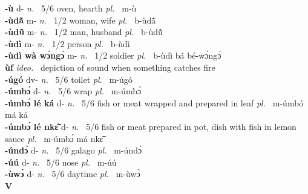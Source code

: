 \noindent
{\bfseries -ù} d- {\itshape n.~} 5/6 oven, hearth {\itshape pl.~} m-ù    \\ 
{\bfseries -ùdã̂} m- {\itshape n.~} 1/2 woman, wife {\itshape pl.~} b-ùdã̂    \\ 
{\bfseries -ùdũ̂} m- {\itshape n.~} 1/2 man, husband {\itshape pl.~} b-ùdũ̂    \\ 
{\bfseries -ùdì} m- {\itshape n.~} 1/2 person {\itshape pl.~} b-ùdì    \\ 
{\bfseries -ùdì wà wɔ́ngɔ́} m- {\itshape n.~} 1/2 soldier {\itshape pl.~} b-ùdì bá bé-wɔ́ngɔ́    \\ 
{\bfseries ùf}  {\itshape ideo.~} depiction of sound when something catches fire    \\ 
{\bfseries -úgó} dv- {\itshape n.~} 5/6 toilet {\itshape pl.~} m-úgó    \\ 
{\bfseries -úmbɔ́} d- {\itshape n.~} 5/6 wrap {\itshape pl.~} m-úmbɔ́    \\ 
{\bfseries -úmbɔ́ lé ká} d- {\itshape n.~} 5/6 fish or meat wrapped and prepared in leaf {\itshape pl.~} m-úmbó má ká    \\ 
{\bfseries -úmbɔ́ lé nkɛ̃̂} d- {\itshape n.~} 5/6  fish or meat prepared in pot, dish with fish in lemon sauce {\itshape pl.~} m-úmbɔ́ má nkɛ̃̂    \\ 
{\bfseries -úndɔ̀} d- {\itshape n.~} 5/6 galago {\itshape pl.~} m-úndɔ̀    \\ 
{\bfseries -úú} d- {\itshape n.~} 5/6 nose {\itshape pl.~} m-úú    \\ 
{\bfseries -ùwɔ̀} d- {\itshape n.~} 5/6 daytime {\itshape pl.~} m-ùwɔ̀    \\

\medskip
\noindent \large {\bfseries V}\normalsize\\
\medskip

